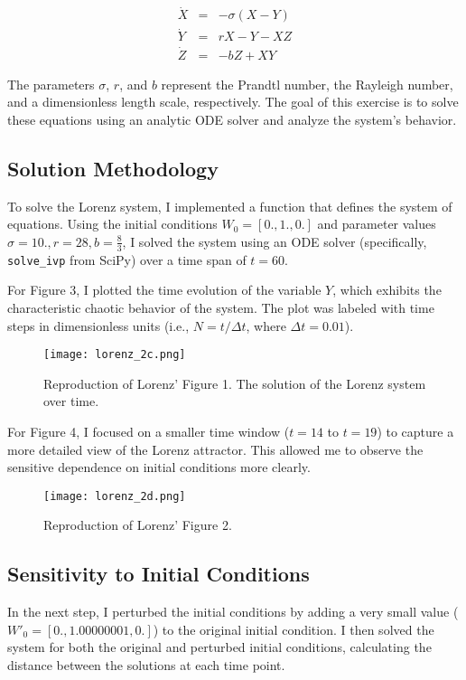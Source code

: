 \documentclass[12pt]{article}
\begin{document}
\begin{eqnarray}
\dot{X} &=& -\sigma(X - Y) \\
\dot{Y} &=& rX - Y - XZ \\
\dot{Z} &=& -bZ + XY
\end{eqnarray}

The parameters \(\sigma\), \(r\), and \(b\) represent the Prandtl number, the Rayleigh number, and a dimensionless length scale, respectively. The goal of this exercise is to solve these equations using an analytic ODE solver and analyze the system's behavior.

\subsection*{Solution Methodology}
To solve the Lorenz system, I implemented a function that defines the system of equations. Using the initial conditions \(W_0 = [0., 1., 0.]\) and parameter values \(\sigma = 10., r = 28, b = \frac{8}{3}\), I solved the system using an ODE solver (specifically, \texttt{solve\_ivp} from SciPy) over a time span of \(t = 60\).

For Figure 3, I plotted the time evolution of the variable \(Y\), which exhibits the characteristic chaotic behavior of the system. The plot was labeled with time steps in dimensionless units (i.e., \(N = t / \Delta t\), where \(\Delta t = 0.01\)).


\begin{figure}[H]
\centering
\texttt{[image: lorenz\_2c.png]}
\caption{Reproduction of Lorenz' Figure 1. The solution of the Lorenz system over time.}
\label{fig:lorenz1}
\end{figure}

For Figure 4, I focused on a smaller time window (\(t = 14\) to \(t = 19\)) to capture a more detailed view of the Lorenz attractor. This allowed me to observe the sensitive dependence on initial conditions more clearly.

\begin{figure}[H]
\centering
\texttt{[image: lorenz\_2d.png]}
\caption{Reproduction of Lorenz' Figure 2.}
\label{fig:lorenz2}
\end{figure}

\subsection*{Sensitivity to Initial Conditions}
In the next step, I perturbed the initial conditions by adding a very small value (\(W'_0 = [0., 1.00000001, 0.]\)) to the original initial condition. I then solved the system for both the original and perturbed initial conditions, calculating the distance between the solutions at each time point.
\end{document}
